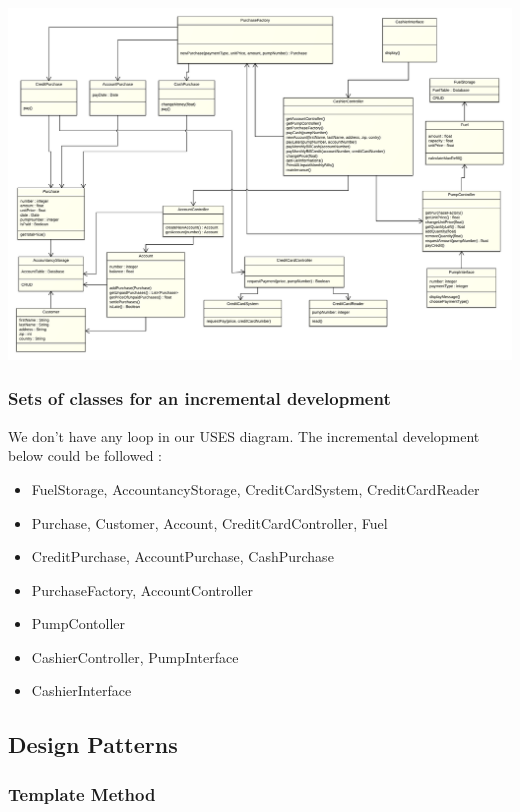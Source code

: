 \documentclass[11pt, a4paper]{article}
\begin{document}
\begin{center}
\centerline{\includegraphics[angle=90, origin=c, width=1\textwidth]{use.png}}
\end{center}


\subsubsection*{Sets of classes for an incremental development}
We don't have any loop in our USES diagram. The incremental development below could be followed : 
\begin{itemize}
\item FuelStorage, AccountancyStorage, CreditCardSystem, CreditCardReader
\item Purchase, Customer, Account, CreditCardController, Fuel
\item CreditPurchase, AccountPurchase, CashPurchase
\item PurchaseFactory, AccountController
\item PumpContoller
\item CashierController, PumpInterface
\item CashierInterface
\end{itemize}

\subsection*{Design Patterns}

\subsubsection{Template Method}
\end{document}
